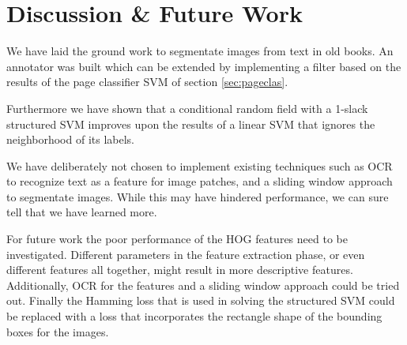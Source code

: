 \section{Discussion \& Future Work}%
\label{sec:discussionconclusion}

We have laid the ground work to segmentate images from text in old books. An
annotator was built which can be extended by implementing a filter
based on the results of the page classifier SVM of section \ref{sec:pageclas}.

Furthermore we have shown that a conditional random field with a 1-slack
structured SVM improves upon the results of a linear SVM that ignores the
neighborhood of its labels.

We have deliberately not chosen to implement existing techniques such as OCR to
recognize text as a feature for image patches, and a sliding window approach to
segmentate images. While this may have hindered performance, we can sure tell
that we have learned more.

For future work the poor performance of the HOG features need to be
investigated. Different parameters in the feature extraction phase, or even
different features all together, might result in more descriptive features.
Additionally, OCR for the features and a sliding window approach could be tried
out. Finally the Hamming loss that is used in solving the structured SVM
could be replaced with a loss that incorporates the rectangle shape of the
bounding boxes for the images.

